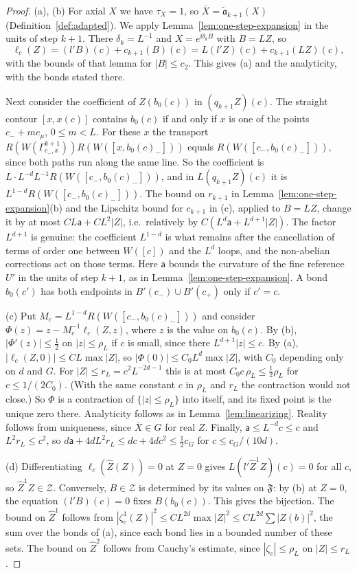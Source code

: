 \begin{proof}
(a), (b) For axial $X$ we have $\tau_X=1$, so $\overline X=\tilde{\mathfrak a}_{k+1}(X)$ (Definition~\ref{def:adapted}). We apply Lemma~\ref{lem:one-step-expansion} in the units of step $k+1$. There $\delta_k=L^{-1}$ and $X=e^{\ii\delta_kB}$ with $B=LZ$, so
\[
\ell_c(Z)=(l'B)(c)+c_{k+1}(B)(c)=L(l'Z)(c)+c_{k+1}(LZ)(c),
\]
with the bounds of that lemma for $|B|\le c_2$. This gives (a) and the analyticity, with the bonds stated there.

Next consider the coefficient of $Z(b_0(c))$ in $(q_{k+1}Z)(c)$. The straight contour $[x,x(c)]$ contains $b_0(c)$ if and only if $x$ is one of the points $c_-+me_\mu$, $0\le m<L$. For these $x$ the transport $R(W(\Gamma^{k+1}_{c_-,x}))R(W([x,b_0(c)_-]))$ equals $R(W([c_-,b_0(c)_-]))$, since both paths run along the same line. So the coefficient is $L\cdot L^{-d}L^{-1}R(W([c_-,b_0(c)_-]))$, and in $L(q_{k+1}Z)(c)$ it is $L^{1-d}R(W([c_-,b_0(c)_-]))$. The bound on $r_{k+1}$ in Lemma~\ref{lem:one-step-expansion}(b) and the Lipschitz bound for $c_{k+1}$ in (c), applied to $B=LZ$, change it by at most $CL\mathsf a+CL^2|Z|$, i.e.\ relatively by $C(L^d\mathsf a+L^{d+1}|Z|)$. The factor $L^{d+1}$ is genuine: the coefficient $L^{1-d}$ is what remains after the cancellation of terms of order one between $W([c])$ and the $L^d$ loops, and the non-abelian corrections act on those terms. Here $\mathsf a$ bounds the curvature of the fine reference $U'$ in the units of step $k+1$, as in Lemma~\ref{lem:one-step-expansion}. A bond $b_0(c')$ has both endpoints in $B'(c_-)\cup B'(c_+)$ only if $c'=c$.

(c) Put $M_c=L^{1-d}R(W([c_-,b_0(c)_-]))$ and consider $\Phi(z)=z-M_c^{-1}\ell_c(Z,z)$, where $z$ is the value on $b_0(c)$. By (b), $|\Phi'(z)|\le\frac12$ on $|z|\le\rho_L$ if $c$ is small, since there $L^{d+1}|z|\le c$. By (a), $|\ell_c(Z,0)|\le CL\max|Z|$, so $|\Phi(0)|\le C_0L^d\max|Z|$, with $C_0$ depending only on $d$ and $G$. For $|Z|\le r_L=c^2L^{-2d-1}$ this is at most $C_0c\,\rho_L\le\frac12\rho_L$ for $c\le1/(2C_0)$. (With the same constant $c$ in $\rho_L$ and $r_L$ the contraction would not close.) So $\Phi$ is a contraction of $\{|z|\le\rho_L\}$ into itself, and its fixed point is the unique zero there. Analyticity follows as in Lemma~\ref{lem:linearizing}. Reality follows from uniqueness, since $\overline X\in G$ for real $Z$. Finally, $\mathsf a\le L^{-d}c\le c$ and $L^2r_L\le c^2$, so $d\mathsf a+4dL^2r_L\le dc+4dc^2\le\frac12c_G$ for $c\le c_G/(10d)$.

(d) Differentiating $\ell_c(\hat Z(Z))=0$ at $Z=0$ gives $L(l'\hat Z^1Z)(c)=0$ for all $c$, so $\hat Z^1Z\in\mathcal Z$. Conversely, $B\in\mathcal Z$ is determined by its values on $\mathfrak F$: by (b) at $Z=0$, the equation $(l'B)(c)=0$ fixes $B(b_0(c))$. This gives the bijection. The bound on $\hat Z^1$ follows from $|\zeta^{1}_c(Z)|^2\le CL^{2d}\max|Z|^2\le CL^{2d}\sum|Z(b)|^2$, the sum over the bonds of (a), since each bond lies in a bounded number of these sets. The bound on $\hat Z^2$ follows from Cauchy's estimate, since $|\zeta_c|\le\rho_L$ on $|Z|\le r_L$.
\end{proof}

